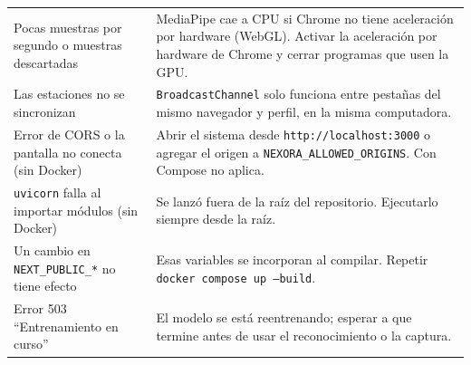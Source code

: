 \begin{table}[H]
\begin{tabularx}{\textwidth}{>{\raggedright\arraybackslash}p{4.4cm} X}
    Pocas muestras por segundo o muestras descartadas & MediaPipe cae a CPU si Chrome no tiene aceleración por hardware (WebGL). Activar la aceleración por hardware de Chrome y cerrar programas que usen la GPU. \\
    Las estaciones no se sincronizan & \texttt{BroadcastChannel} solo funciona entre pestañas del mismo navegador y perfil, en la misma computadora. \\
    Error de CORS o la pantalla no conecta (sin Docker) & Abrir el sistema desde \texttt{http://localhost:3000} o agregar el origen a \texttt{NEXORA\_ALLOWED\_ORIGINS}. Con Compose no aplica. \\
    \texttt{uvicorn} falla al importar módulos (sin Docker) & Se lanzó fuera de la raíz del repositorio. Ejecutarlo siempre desde la raíz. \\
    Un cambio en \texttt{NEXT\_PUBLIC\_*} no tiene efecto & Esas variables se incorporan al compilar. Repetir \texttt{docker compose up --build}. \\
    Error 503 ``Entrenamiento en curso'' & El modelo se está reentrenando; esperar a que termine antes de usar el reconocimiento o la captura. \\
    \bottomrule
  \end{tabularx}
\end{table}
